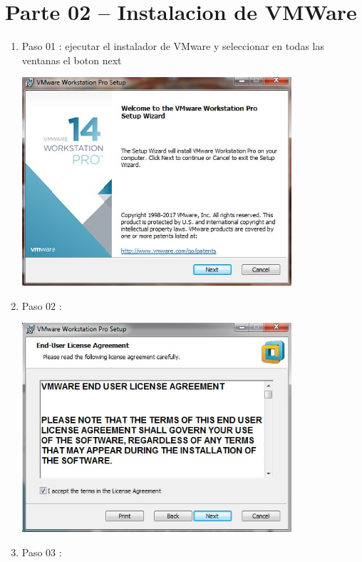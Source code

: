 \section{Parte 02 – Instalacion de VMWare} 

\begin{enumerate}[1.]
	\item Paso 01 : ejecutar el instalador de VMware y seleccionar en todas las ventanas el boton next
	
	\begin{center}
	\includegraphics[width=10cm]{./Imagenes/WM01} 
	\end{center}

	\item Paso 02 :

	\begin{center}
	\includegraphics[width=10cm]{./Imagenes/WM02} 
	\end{center}

	\hfill \break
	\hfill \break
	\hfill \break
	\hfill \break
	\hfill \break
	\hfill \break
	\item Paso 03 :


\end{enumerate}
